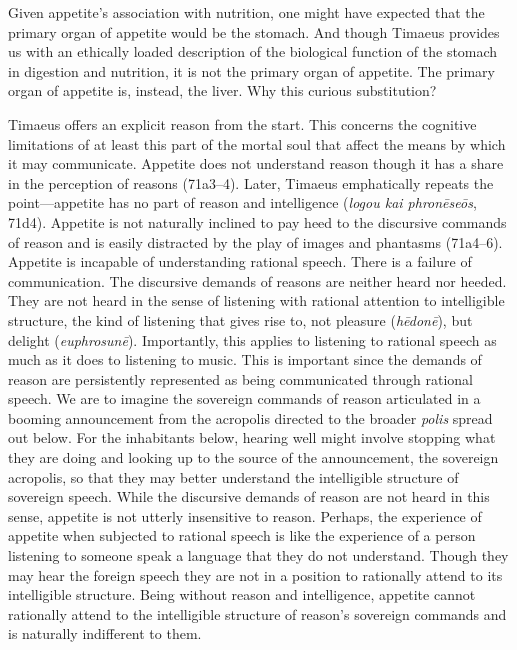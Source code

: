 Given appetite's association with nutrition, one might have expected that the primary organ of appetite would be the stomach. And though Timaeus provides us with an ethically loaded description of the biological function of the stomach in digestion and nutrition, it is not the primary organ of appetite. The primary organ of appetite is, instead, the liver. Why this curious substitution?

Timaeus offers an explicit reason from the start. This concerns the cognitive limitations of at least this part of the mortal soul that affect the means by which it may communicate. Appetite does not understand reason though it has a share in the perception of reasons (71a3--4). Later, Timaeus emphatically repeats the point---appetite has no part of reason and intelligence (\emph{logou kai phronēseōs}, 71d4). Appetite is not naturally inclined to pay heed to the discursive commands of reason and is easily distracted by the play of images and phantasms (71a4--6). Appetite is incapable of understanding rational speech. There is a failure of communication. The discursive demands of reasons are neither heard nor heeded. They are not heard in the sense of listening with rational attention to intelligible structure, the kind of listening that gives rise to, not pleasure (\emph{hēdonē}), but delight (\emph{euphrosunē}). Importantly, this applies to listening to rational speech as much as it does to listening to music. This is important since the demands of reason are persistently represented as being communicated through rational speech. We are to imagine the sovereign commands of reason articulated in a booming announcement from the acropolis directed to the broader \emph{polis} spread out below. For the inhabitants below, hearing well might involve stopping what they are doing and looking up to the source of the announcement, the sovereign acropolis, so that they may better understand the intelligible structure of sovereign speech. While the discursive demands of reason are not heard in this sense, appetite is not utterly insensitive to reason. Perhaps, the experience of appetite when subjected to rational speech is like the experience of a person listening to someone speak a language that they do not understand. Though they may hear the foreign speech they are not in a position to rationally attend to its intelligible structure. Being without reason and intelligence, appetite cannot rationally attend to the intelligible structure of reason's sovereign commands and is naturally indifferent to them.

